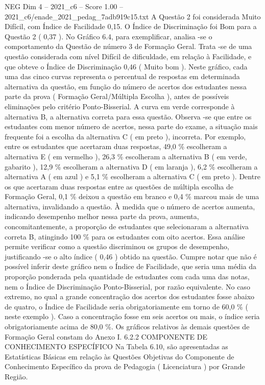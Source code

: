 \begin{textsample}{NEG Dim 4 – 2021\_c6 – Score 1.00 – 2021\_c6/enade\_2021\_pedag\_7adb919c15.txt}
A Questão 2 foi considerada Muito Difícil, com Índice de Facilidade 0,15.
O Índice de Discriminação foi Bom para a Questão 2 ( 0,37 ).
No Gráfico 6.4, para exemplificar, analisa -se o comportamento da Questão de número 3 de Formação Geral.
Trata -se de uma questão considerada com nível Difícil de dificuldade, em relação à Facilidade, e que obteve o Índice de Discriminação 0,46 ( Muito bom ).
Neste gráfico, cada uma das cinco curvas representa o percentual de respostas em determinada alternativa da questão, em função do número de acertos dos estudantes nessa parte da prova ( Formação Geral/Múltipla Escolha ), antes de possíveis eliminações pelo critério Ponto-Bisserial.
A curva em verde corresponde à alternativa B, a alternativa correta para essa questão.
Observa -se que entre os estudantes com menor número de acertos, nessa parte do exame, a situação mais frequente foi a escolha da alternativa C ( em preto ), incorreta.
Por exemplo, entre os estudantes que acertaram duas respostas, 49,0 \% escolheram a alternativa E ( em vermelho ), 26,3 \% escolheram a alternativa B ( em verde, gabarito ), 12,9 \% escolheram a alternativa D ( em laranja ), 6,2 \% escolheram a alternativa A ( em azul ) e 5,1 \% escolheram a alternativa C ( em preto ).
Dentre os que acertaram duas respostas entre as questões de múltipla escolha de Formação Geral, 0,1 \% deixou a questão em branco e 0,4 \% marcou mais de uma alternativa, invalidando a questão.
À medida que o número de acertos aumenta, indicando desempenho melhor nessa parte da prova, aumenta, concomitantemente, a proporção de estudantes que selecionaram a alternativa correta B, atingindo 100 \% para os estudantes com oito acertos.
Essa análise permite verificar como a questão discriminou os grupos de desempenho, justificando -se o alto índice ( 0,46 ) obtido na questão.
Cumpre notar que não é possível inferir deste gráfico nem o Índice de Facilidade, que seria uma média da proporção ponderada pela quantidade de estudantes com cada uma das notas, nem o Índice de Discriminação Ponto-Bisserial, por razão equivalente.
No caso extremo, no qual a grande concentração dos acertos dos estudantes fosse abaixo de quatro, o Índice de Facilidade seria obrigatoriamente em torno de 60,0 \% ( neste exemplo ).
Caso a concentração fosse em seis acertos ou mais, o índice seria obrigatoriamente acima de 80,0 \%.
Os gráficos relativos às demais questões de Formação Geral constam do Anexo I. 6.2.2 COMPONENTE DE CONHECIMENTO ESPECÍFICO Na Tabela 6.10, são apresentadas as Estatísticas Básicas em relação às Questões Objetivas do Componente de Conhecimento Específico da prova de Pedagogia ( Licenciatura ) por Grande Região.

\end{textsample}
